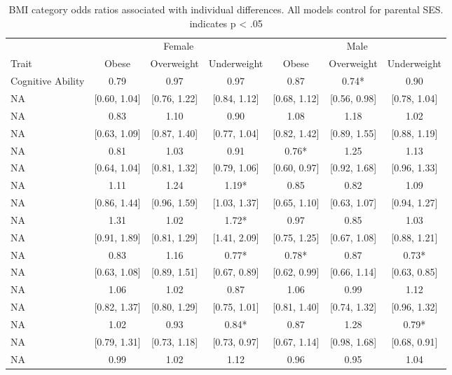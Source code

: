 \documentclass[man]{apa6}
\makeatletter
\newcommand\LastLTentrywidth{1em}
\newlength\longtablewidth
\newcommand{\getlongtablewidth}{\begingroup \ifcsname LT@\roman{LT@tables}\endcsname \global\longtablewidth=0pt \renewcommand{\LT@entry}[2]{\global\advance\longtablewidth by ##2\relax\gdef\LastLTentrywidth{##2}}\@nameuse{LT@\roman{LT@tables}} \fi \endgroup}
\makeatother
\begin{document}
\begin{center}
\begin{ThreePartTable}
\small{
\begin{longtable}{lcccccc}\noalign{\getlongtablewidth\global\LTcapwidth=\longtablewidth}
\caption{\label{tab:tablepers}BMI category odds ratios associated with individual differences. All models control for parental SES. \* indicates p < .05}\\
\toprule
 & \multicolumn{3}{c}{Female} & \multicolumn{3}{c}{Male} \\
\cmidrule(r){2-4} \cmidrule(r){5-7}
Trait & Obese & Overweight & Underweight & Obese & Overweight & Underweight\\
\midrule
Cognitive Ability & 0.79 & 0.97 & 0.97 & 0.87 & 0.74* & 0.90\\
NA & [0.60, 1.04] & [0.76, 1.22] & [0.84, 1.12] & [0.68, 1.12] & [0.56, 0.98] & [0.78, 1.04]\\
NA & 0.83 & 1.10 & 0.90 & 1.08 & 1.18 & 1.02\\
NA & [0.63, 1.09] & [0.87, 1.40] & [0.77, 1.04] & [0.82, 1.42] & [0.89, 1.55] & [0.88, 1.19]\\
NA & 0.81 & 1.03 & 0.91 & 0.76* & 1.25 & 1.13\\
NA & [0.64, 1.04] & [0.81, 1.32] & [0.79, 1.06] & [0.60, 0.97] & [0.92, 1.68] & [0.96, 1.33]\\
NA & 1.11 & 1.24 & 1.19* & 0.85 & 0.82 & 1.09\\
NA & [0.86, 1.44] & [0.96, 1.59] & [1.03, 1.37] & [0.65, 1.10] & [0.63, 1.07] & [0.94, 1.27]\\
NA & 1.31 & 1.02 & 1.72* & 0.97 & 0.85 & 1.03\\
NA & [0.91, 1.89] & [0.81, 1.29] & [1.41, 2.09] & [0.75, 1.25] & [0.67, 1.08] & [0.88, 1.21]\\
NA & 0.83 & 1.16 & 0.77* & 0.78* & 0.87 & 0.73*\\
NA & [0.63, 1.08] & [0.89, 1.51] & [0.67, 0.89] & [0.62, 0.99] & [0.66, 1.14] & [0.63, 0.85]\\
NA & 1.06 & 1.02 & 0.87 & 1.06 & 0.99 & 1.12\\
NA & [0.82, 1.37] & [0.80, 1.29] & [0.75, 1.01] & [0.81, 1.40] & [0.74, 1.32] & [0.96, 1.32]\\
NA & 1.02 & 0.93 & 0.84* & 0.87 & 1.28 & 0.79*\\
NA & [0.79, 1.31] & [0.73, 1.18] & [0.73, 0.97] & [0.67, 1.14] & [0.98, 1.68] & [0.68, 0.91]\\
NA & 0.99 & 1.02 & 1.12 & 0.96 & 0.95 & 1.04\\

\end{longtable}}
\end{ThreePartTable}
\end{center}
\end{document}
